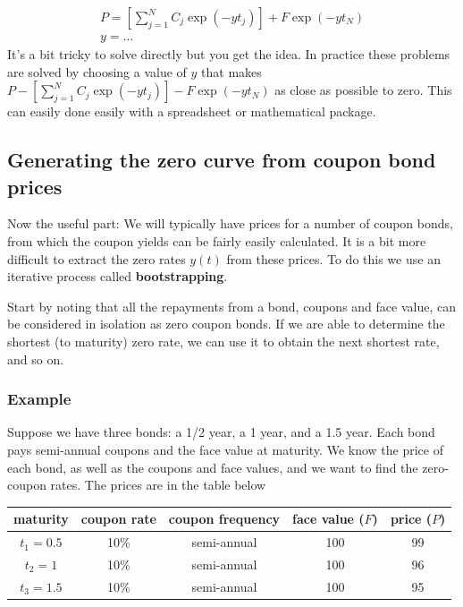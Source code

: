 \documentclass{tran-l}
\theoremstyle{definition}
\theoremstyle{remark}
\numberwithin{equation}{subsection}
\begin{document}
\begin{eqnarray*}
P = \left[\sum_{j=1}^N C_j\exp(-yt_j)\right] + F \exp(-yt_N) \\
y = \ldots
\end{eqnarray*}
It's a bit tricky to solve directly but you get the idea. In practice these problems are solved by choosing a value of $y$ that makes $P- \left[\sum_{j=1}^N C_j\exp(-yt_j)\right] - F \exp(-yt_N)$ as close as possible to zero. This can easily done easily with a spreadsheet or mathematical package.

\subsection{Generating the zero curve from coupon bond prices}

Now the useful part: We will typically have prices for a number of coupon bonds, from which the coupon yields can be fairly easily calculated. It is a bit more difficult to extract the zero rates $y(t)$ from these prices. To do this we use an iterative process called \textbf{bootstrapping}.

Start by noting that all the repayments from a bond, coupons and face value, can be considered in isolation as zero coupon bonds. If we are able to determine the shortest (to maturity) zero rate, we can use it to obtain the next shortest rate, and so on.

\subsubsection{Example} Suppose we have three bonds: a 1/2 year, a 1 year, and a 1.5 year. Each bond pays semi-annual coupons and the face value at maturity. We know the price of each bond, as well as the coupons and face values, and we want to find the zero-coupon rates. The prices are in the table below

\begin{tabular}{|c|c|c|c|c|}
  \hline
  maturity & coupon rate & coupon frequency & face value ($F$) & price ($P$) \\
  \hline
  $t_1 = 0.5$ & 10\%  & semi-annual & 100 & 99 \\
  $t_2 = 1$ & 10\%  & semi-annual & 100 & 96 \\
  $t_3 = 1.5$ & 10\% & semi-annual & 100 & 95 \\
  \hline
\end{tabular}
\end{document}
